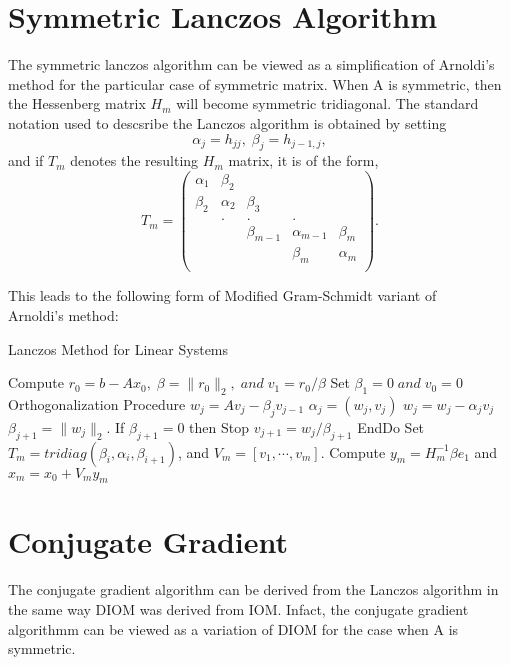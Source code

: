\documentclass[10pt,a4paper]{article}
\begin{document}
\section{Symmetric Lanczos Algorithm}

The symmetric lanczos algorithm can be viewed as a simplification of Arnoldi's method for the particular case of symmetric matrix. When A is symmetric, then the Hessenberg matrix $H_m$ will become symmetric tridiagonal. The standard notation used to descsribe the Lanczos algorithm is obtained by setting 
$$\alpha_j=h_{jj},\;\beta_j=h_{j-1,j},$$
and if $T_m$ denotes the resulting $H_m$ matrix, it is of the form,
$$
T_m = \left( \begin{array}{ccccc}
\alpha_1 & \beta_2 &  &  &  \\
\beta_2 & \alpha_2 & \beta_3 &  &  \\
 & . & . & . &  \\
 &  & \beta_{m-1} & \alpha_{m-1} & \beta_{m} \\
 &  &  & \beta_m & \alpha_m \\
\end{array} \right). 
$$

This leads to the following form of Modified Gram-Schmidt variant of \\ Arnoldi's method:

\begin{algorithm}
\caption{Lanczos Method for Linear Systems}
\begin{algorithmic}[1]
\State Compute $r_0=b-Ax_0,\;\beta=\|r_0\|_2,\;and\;v_1=r_0/\beta$
\State Set $\beta_1=0\;and\;v_0=0$
 \Comment Orthogonalization Procedure
	\State $w_j = Av_j-\beta_jv_{j-1}$
	\State $\alpha_j=(w_j,v_j)$
	\State $w_j = w_j-\alpha_jv_j$
	\State $\beta_{j+1} = \|w_j\|_2.$ If $\beta_{j+1}=0$ then Stop
	\State $v_{j+1} = w_j/\beta_{j+1}$
\EndFor
\State EndDo
\State Set $T_m=tridiag(\beta_i,\alpha_i,\beta_{i+1})$, and $V_m=[v_1,\cdots,v_m].$
\State Compute $y_m=H^{-1}_m\beta e_1$ and $x_m=x_0+V_my_m$
\end{algorithmic}
\end{algorithm}

\section{Conjugate Gradient}

The conjugate gradient algorithm can be derived from the Lanczos algorithm in the same way DIOM was derived from IOM. Infact, the conjugate gradient algorithmm can be viewed as a variation of DIOM for the case when A is symmetric.
\end{document}
